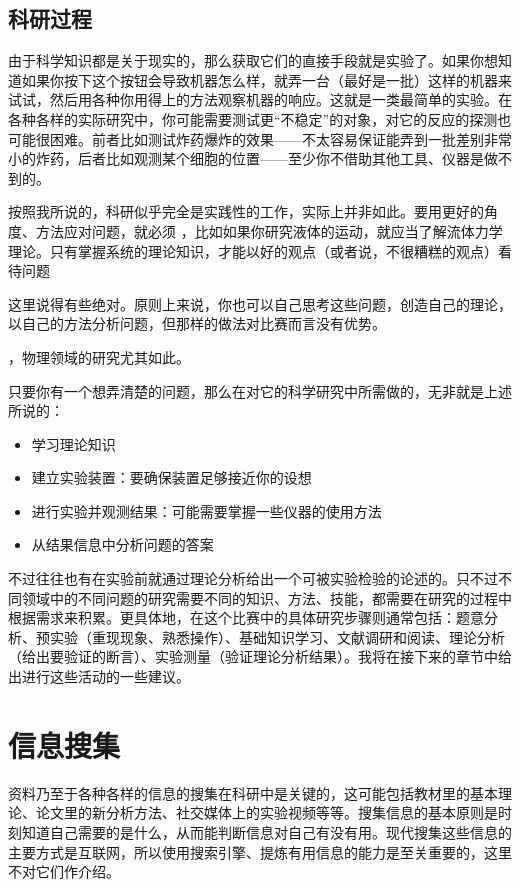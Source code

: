 \documentclass[a4paper,10pt,english]{sphinxmanual}
\begin{document}
\section{科研过程}
\label{\detokenize{3. Intro_Research:id4}}
由于科学知识都是关于现实的，那么获取它们的直接手段就是实验了。如果你想知道如果你按下这个按钮会导致机器怎么样，就弄一台（最好是一批）这样的机器来试试，然后用各种你用得上的方法观察机器的响应。这就是一类最简单的实验。在各种各样的实际研究中，你可能需要测试更“不稳定”的对象，对它的反应的探测也可能很困难。前者比如测试炸药爆炸的效果——不太容易保证能弄到一批差别非常小的炸药，后者比如观测某个细胞的位置——至少你不借助其他工具、仪器是做不到的。

按照我所说的，科研似乎完全是实践性的工作，实际上并非如此。要用更好的角度、方法应对问题，就必须  ，比如如果你研究液体的运动，就应当了解流体力学理论。只有掌握系统的理论知识，才能以好的观点（或者说，不很糟糕的观点）看待问题 %
\begin{footnote}[2]\sphinxAtStartFootnote
这里说得有些绝对。原则上来说，你也可以自己思考这些问题，创造自己的理论，以自己的方法分析问题，但那样的做法对比赛而言没有优势。
%
\end{footnote} ，物理领域的研究尤其如此。

只要你有一个想弄清楚的问题，那么在对它的科学研究中所需做的，无非就是上述所说的：
\begin{itemize}
\item {} 
学习理论知识

\item {} 
建立实验装置：要确保装置足够接近你的设想

\item {} 
进行实验并观测结果：可能需要掌握一些仪器的使用方法

\item {} 
从结果信息中分析问题的答案

\end{itemize}

不过往往也有在实验前就通过理论分析给出一个可被实验检验的论述的。只不过不同领域中的不同问题的研究需要不同的知识、方法、技能，都需要在研究的过程中根据需求来积累。更具体地，在这个比赛中的具体研究步骤则通常包括：题意分析、预实验（重现现象、熟悉操作）、基础知识学习、文献调研和阅读、理论分析（给出要验证的断言）、实验测量（验证理论分析结果）。我将在接下来的章节中给出进行这些活动的一些建议。


\chapter{信息搜集}
\label{\detokenize{4. GetInfo:id1}}\label{\detokenize{4. GetInfo::doc}}
资料乃至于各种各样的信息的搜集在科研中是关键的，这可能包括教材里的基本理论、论文里的新分析方法、社交媒体上的实验视频等等。搜集信息的基本原则是时刻知道自己需要的是什么，从而能判断信息对自己有没有用。现代搜集这些信息的主要方式是互联网，所以使用搜索引擎、提炼有用信息的能力是至关重要的，这里不对它们作介绍。
\end{document}
